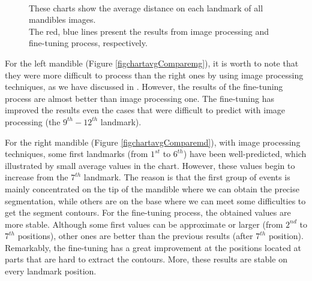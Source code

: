 \documentclass[review]{elsarticle}
\begin{document}
\begin{figure}[h!]
    \centering
    ~~
    \caption{These charts show the average distance on each landmark of all mandibles images.\\ The red, blue lines present the results from image processing and fine-tuning process, respectively.}
    \label{figchartavgCompare}
\end{figure}

For the left mandible (Figure \ref{figchartavgComparemg}), it is worth to note that they were more difficult to process than the right ones by using image processing techniques, as we have discussed in \cite{le2017maelab}. However, the results of the fine-tuning process are almost better than image processing one. The fine-tuning has improved the results even the cases that were difficult to predict with image processing (the $9^{th} - 12^{th}$ landmark).

For the right mandible (Figure \ref{figchartavgComparemd}), with image processing techniques, some first landmarks (from $1^{st}$ to $6^{th}$) have been well-predicted, which illustrated by small average values in the chart. However, these values begin to increase from the $7^{th}$ landmark. The reason is that the first group of events is mainly concentrated on the tip of the mandible where we can obtain the precise segmentation, while others are on the base where we can meet some difficulties to get the segment contours. For the fine-tuning process, the obtained values are more stable. Although some first values can be approximate or larger (from $2^{nd}$ to $7^{th}$ positions), other ones are better than the previous results (after $7^{th}$ position). Remarkably, the fine-tuning has a great improvement at the positions located at parts that are hard to extract the contours. More, these results are stable on every landmark position. 
\end{document}
